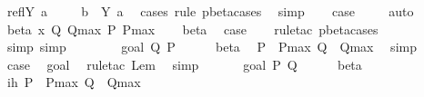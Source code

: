 \begin{isabellebody}
\isanewline
{}\isamarkupfalse%
\ {\isacharparenleft}reflY\ a{\isacharparenright}\ \isamarkupfalse%
\ \isamarkupfalse%
\ {}{\isacharcolon}\ {\isachardoublequoteopen}b\ {\isacharequal}\ Y\ a{\isachardoublequoteclose}\ \isamarkupfalse%
\ {\isacharparenleft}cases\ rule{\isacharcolon}\ pbeta{\isachardot}cases{\isacharparenright}\ \isamarkupfalse%
\ simp\isanewline
\ \ \isamarkupfalse%
\ {\isacharquery}case\ \isamarkupfalse%
\ {}\ \isamarkupfalse%
\ auto\isanewline
{}\isamarkupfalse%
\isanewline
{}\isamarkupfalse%
\ {\isacharparenleft}beta\ x\ Q\ Qmax\ P\ Pmax{\isacharparenright}\isanewline
\ \ \isamarkupfalse%
\ beta{\isacharparenleft}{}{\isacharcomma}{}{\isacharparenright}\ \isamarkupfalse%
\ {\isacharquery}case\isanewline
\ \ \isamarkupfalse%
\ {\isacharparenleft}rule{\isacharunderscore}tac\ pbeta{\isacharunderscore}cases{\isacharunderscore}{}{\isacharparenright}\isanewline
\ \ \isamarkupfalse%
\ {\isacharparenleft}simp{\isacharcomma}\ simp{\isacharparenright}\isanewline
\ \ \isamarkupfalse%
\ {\isacharminus}\isanewline
\ \ \isamarkupfalse%
\ {\isacharparenleft}goal{}\ Q{\isacharprime}\ P{\isacharprime}{\isacharparenright}\isanewline
\ \ \ \ \isamarkupfalse%
\ beta\ \isamarkupfalse%
\ {\isachardoublequoteopen}P{\isacharprime}\ {\isasymggreater}\ Pmax{\isachardoublequoteclose}\ {\isachardoublequoteopen}Q{\isacharprime}\ {\isasymggreater}\ Qmax{\isachardoublequoteclose}\ \isamarkupfalse%
\ simp{\isacharplus}\isanewline
\ \ \ \ \isamarkupfalse%
\ {\isacharquery}case\ \isamarkupfalse%
\ goal{}\ \isamarkupfalse%
\ {\isacharparenleft}rule{\isacharunderscore}tac\ Lem{}{\isacharunderscore}{}{\isacharunderscore}{}{\isacharparenright}\ \isamarkupfalse%
\ simp{\isacharplus}\isanewline
\ \ \isamarkupfalse%
\isanewline
\ \ \isamarkupfalse%
\ {\isacharparenleft}goal{}\ P{\isacharprime}\ Q{\isacharprime}{\isacharparenright}\isanewline
\ \ \ \ \isamarkupfalse%
\ beta\ \isamarkupfalse%
\ ih{\isacharcolon}\ {\isachardoublequoteopen}P{\isacharprime}\ {\isasymggreater}\ Pmax{\isachardoublequoteclose}\ {\isachardoublequoteopen}Q{\isacharprime}\ {\isasymggreater}\ Qmax{\isachardoublequoteclose}\ \isamarkupfalse%

\end{isabellebody}
